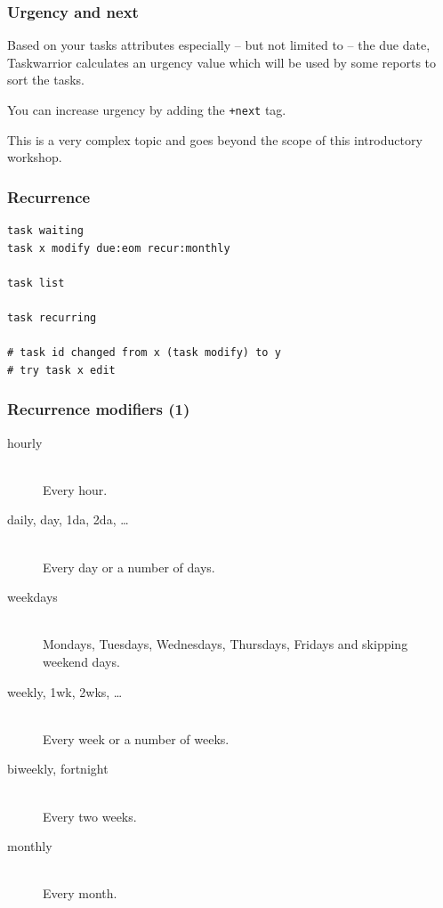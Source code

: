 \documentclass[t,handout]{beamer}
\begin{document}
\begin{frame}[fragile]\frametitle{Urgency and next}
    \vfill
    Based on your tasks attributes especially -- but not limited to -- the due date, Taskwarrior calculates an urgency value which will be used by some reports to sort the tasks. \pause

    You can increase urgency by adding the \verb=+next= tag. \pause

    This is a very complex topic and goes beyond the scope of this introductory workshop.
\end{frame}

\begin{frame}[fragile]\frametitle{Recurrence}
    \vfill
    \begin{lstlisting}
task waiting
task x modify due:eom recur:monthly

task list

task recurring

# task id changed from x (task modify) to y
# try task x edit\end{lstlisting}
\end{frame}

\begin{frame}[fragile]\frametitle{Recurrence modifiers (1)}
    \vfill
    \begin{description}
        \item[hourly] \hfill \\
            Every hour.
        \item[daily, day, 1da, 2da, \ldots] \hfill \\
            Every day or a number of days.
        \item[weekdays] \hfill \\
            Mondays, Tuesdays, Wednesdays, Thursdays, Fridays and skipping weekend days.
        \item[weekly, 1wk, 2wks, \ldots] \hfill \\
            Every week or a number of weeks.
        \item[biweekly, fortnight] \hfill \\
            Every two weeks.
        \item[monthly] \hfill \\
            Every month.
    \end{description}
\end{frame}
\end{document}
